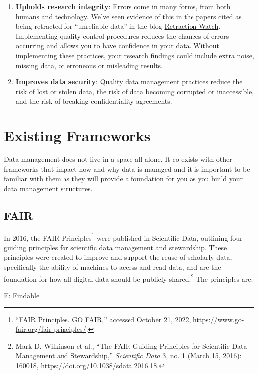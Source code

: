 \documentclass[
]{book}
\begin{document}
\begin{enumerate}
\item
  \textbf{Upholds research integrity}: Errors come in many forms, from both humans and technology. We've seen evidence of this in the papers cited as being retracted for ``unreliable data'' in the blog \href{https://retractionwatch.com/}{Retraction Watch}. Implementing quality control procedures reduces the chances of errors occurring and allows you to have confidence in your data. Without implementing these practices, your research findings could include extra noise, missing data, or erroneous or misleading results.
\item
  \textbf{Improves data security}: Quality data management practices reduce the risk of lost or stolen data, the risk of data becoming corrupted or inaccessible, and the risk of breaking confidentiality agreements.
\end{enumerate}

\hypertarget{existing-frameworks}{%
\section{Existing Frameworks}\label{existing-frameworks}}

Data management does not live in a space all alone. It co-exists with other frameworks that impact how and why data is managed and it is important to be familiar with them as they will provide a foundation for you as you build your data management structures.

\hypertarget{fair}{%
\subsection{FAIR}\label{fair}}

In 2016, the FAIR Principles\footnote{{``{FAIR} Principles. {GO} {FAIR},''} accessed October 21, 2022, \url{https://www.go-fair.org/fair-principles/}.} were published in Scientific Data, outlining four guiding principles for scientific data management and stewardship. These principles were created to improve and support the reuse of scholarly data, specifically the ability of machines to access and read data, and are the foundation for how all digital data should be publicly shared.\footnote{Mark D. Wilkinson et al., {``The {FAIR} Guiding Principles for Scientific Data Management and Stewardship,''} \emph{Scientific Data} 3, no. 1 (March 15, 2016): 160018, \url{https://doi.org/10.1038/sdata.2016.18}.} The principles are:

F: Findable
\end{document}
